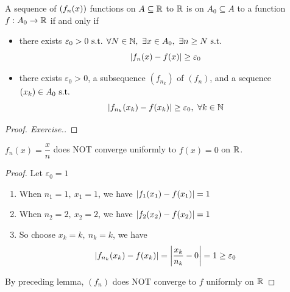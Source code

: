 \documentclass[a4paper,12pt]{article}
\begin{document}
\begin{lemma}
    A sequence of \(\seqfun[n ]{x }\) functions on \(A\subseteq\R\) to \(\R\) is  on \(A_0\subseteq A\) to a function \(f:A_0\rightarrow\R\) if and only if 
    \begin{itemize}
        \item there exists \(\varepsilon_0>0\st\forall N\in\N,\ \exists x\in A_0,\ \exists n\ge N\st\)
        \[\abs{f_n(x)-f(x)}\ge\varepsilon_0\]
        \item there exists \(\varepsilon_0>0\), a subsequence \((f_{n_k})\) of \((f_n)\), and a sequence \(\seq{x }{k }\in A_0\st\) 
        \[\abs{f_{n_k}(x_k)-f(x_k)}\ge\varepsilon_0,\ \forall k\in\N\]
    \end{itemize}
    
    \begin{proof}[Proof. Exercise.]
        
    \end{proof}
\end{lemma}

\newpage

\begin{example}
    \(f_n(x)=\dfrac{x }{n }\) does NOT converge uniformly to \(f(x)=0\) on \(\R\).
    \begin{proof}
        Let \(\varepsilon_0=1\)
        \begin{enumerate}
            \item When \(n_1=1,\ x_1=1\), we have \(\abs{f_1(x_1)-f(x_1)}= 1\)
            \item When \(n_2=2,\ x_2=2\), we have \(\abs{f_2(x_2)-f(x_2)}= 1\)
            \item So choose \(x_k=k,\ n_k=k\), we have 
            \[\abs{f_{n_k}(x_k)-f(x_k)}=\abs{\frac{x_k }{n_k}-0}=1\ge \varepsilon_0\]
        \end{enumerate}
        By preceding lemma, \((f_n)\) does NOT converge to \(f\) uniformly on \(\R\)
    \end{proof}
\end{example}
\end{document}
